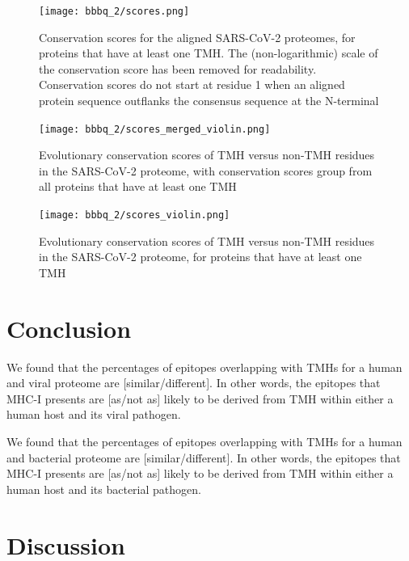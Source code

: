 \begin{figure}[!htbp]
  \texttt{[image: bbbq\_2/scores.png]}
  \caption{
    Conservation scores for the aligned SARS-CoV-2 proteomes,
    for proteins that have at least one TMH.
    The (non-logarithmic) scale of the conservation score has been removed
    for readability.
    Conservation scores do not start at residue 1 when
    an aligned protein sequence outflanks the consensus sequence 
    at the N-terminal
  }
  \label{fig:evolutionary_conservation}
\end{figure}

\begin{figure}[!htbp]
  \texttt{[image: bbbq\_2/scores\_merged\_violin.png]}
  \caption{
    Evolutionary conservation scores of TMH versus non-TMH
    residues in the SARS-CoV-2 proteome,
    with conservation scores group from all proteins that have at least one TMH
  }
  \label{fig:evolutionary_conservation_merged}
\end{figure}

\begin{figure}[!htbp]
  \texttt{[image: bbbq\_2/scores\_violin.png]}
  \caption{
    Evolutionary conservation scores of TMH versus non-TMH
    residues in the SARS-CoV-2 proteome,
    for proteins that have at least one TMH
  }
  \label{fig:evolutionary_conservation_violin}
\end{figure}



\section{Conclusion}

We found that the percentages of epitopes overlapping 
with TMHs for a human and viral proteome are 
[similar/different]. In other words, the
epitopes that MHC-I presents are [as/not as] likely 
to be derived from TMH within either a human host and its viral pathogen.

We found that the percentages of epitopes overlapping 
with TMHs for a human and bacterial proteome are 
[similar/different]. In other words, the
epitopes that MHC-I presents are [as/not as] likely 
to be derived from TMH within either a human host and its bacterial pathogen.

\section{Discussion}

